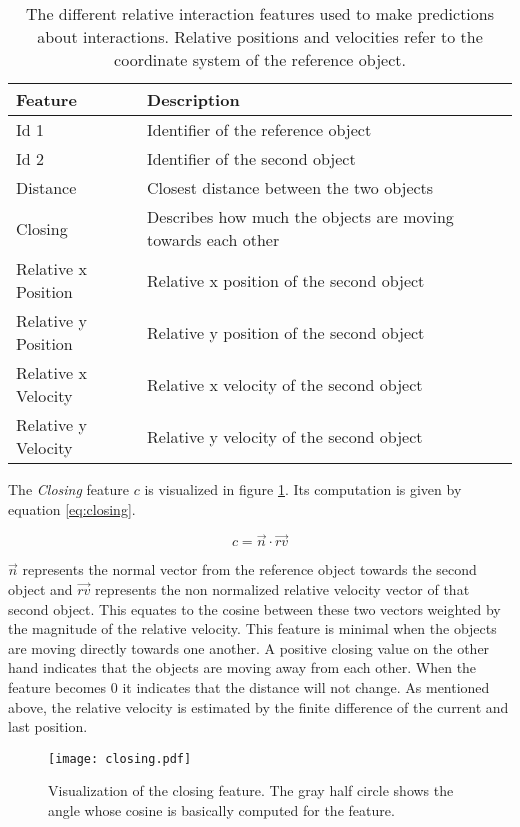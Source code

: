 \begin{table}
	\centering
	\begin{tabular*}{\textwidth}{@{\extracolsep{\fill} } l l}
		\hline \textbf{Feature} & \textbf{Description} \\ 
		\hline \hline 
		 Id 1 & Identifier of the reference object \\ 
		 Id 2 & Identifier of the second object \\ 
		 Distance & Closest distance between the two objects \\
		 Closing & Describes how much the objects are moving towards each other \\
		 Relative x Position & Relative x position of the second object \\
		 Relative y Position & Relative y position of the second object \\
		 Relative x Velocity & Relative x velocity of the second object \\
		 Relative y Velocity & Relative y velocity of the second object \\
		\hline 
	\end{tabular*} 
	\caption{The different relative interaction features used to make predictions about interactions. Relative positions and velocities refer to the coordinate system of the reference object.}
	\label{tab:gateInteractionFeatures}
\end{table}

The \textit{Closing} feature $c$ is visualized in figure \ref{fig:closing}. Its computation is given by equation \ref{eq:closing}.

\begin{equation}
  c = \vec{n} \cdot \vec{rv}
 \label{eq:closing}
\end{equation}

$\vec{n}$ represents the normal vector from the reference object towards the second object and $\vec{rv}$ represents the non normalized relative velocity vector of that second object. This equates to the cosine between these two vectors weighted by the magnitude of the relative velocity. This feature is minimal when the objects are moving directly towards one another. A positive closing value on the other hand indicates that the objects are moving away from each other. When the feature becomes 0 it indicates that the distance will not change. As mentioned above, the relative velocity is estimated by the finite difference of the current and last position.

\begin{figure}
	\centering
	\texttt{[image: closing.pdf]}
	\caption{Visualization of the closing feature. The gray half circle shows the angle whose cosine is basically computed for the feature.} 
	\label{fig:closing}
\end{figure} 

